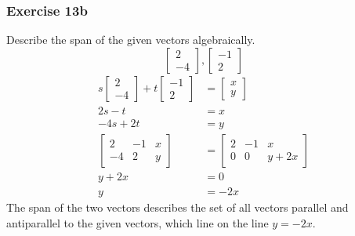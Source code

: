\documentclass{math}
\begin{document}
\subsubsection*{Exercise 13b}
Describe the span of the given vectors algebraically.
\[ \begin{bmatrix}2 \\ -4\end{bmatrix},\begin{bmatrix}-1 \\ 2\end{bmatrix} \]
\begin{align*}
  s\begin{bmatrix}2 \\ -4\end{bmatrix}+t\begin{bmatrix}-1 \\ 2\end{bmatrix} &=
    \begin{bmatrix}x \\ y\end{bmatrix} \\
  2s-t &= x\\
  -4s+2t &= y \\
  \begin{bmatrix}
    2 & -1 & x \\
    -4 & 2 & y
  \end{bmatrix} &= \begin{bmatrix}
    2 & -1 & x \\
    0 & 0 & y+2x
  \end{bmatrix} \\
  y+2x &= 0 \\
  y &= -2x
\end{align*}
The span of the two vectors describes the set of all vectors parallel and
antiparallel to the given vectors, which line on the line \( y = -2x \).
\end{document}
